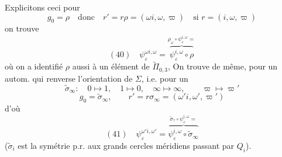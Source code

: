 \documentclass[11pt,a4paper]{article}
\begin{document}
Explicitons ceci pour
\[
  g_0 = \rho \quad \text{donc} \quad
  r' = r\rho = (\omega i, \omega, \varpi) \quad \text{si } r = (i, \omega, \varpi)
\]
on trouve
\[
  (40)\quad
  \psi_\varepsilon^{\omega i, \omega}
  = \overbrace{\psi_\varepsilon^{i,\omega} \circ \rho}^{\rho_\omega \circ \psi_\varepsilon^{i,\omega} =}
\]
où on a identifié $\rho$ aussi à un élément de $\widetilde{\Pi}_{0,3}$,
On trouve de même, pour un autom. qui renverse l'orientation de
$\Sigma$, i.e. pour un
\[
  \widetilde{\sigma}_\infty : \quad
  0 \mapsto 1, \quad 1 \mapsto 0, \quad \infty \mapsto \infty,
  \qquad \varpi \mapsto \varpi'
\]
\[
  g_0 = \widetilde{\sigma}_\infty, \qquad
  r' = r \sigma_\infty = (\omega' i, \omega', \varpi')
\]
d'où
\[
  (41)\quad
  \psi_\varepsilon^{\omega' i, \omega'}
  = \overbrace{\psi_\varepsilon^{i,\omega} \circ \widetilde{\sigma}_\infty}^{\widetilde{\sigma}_{?} \circ \psi_\varepsilon^{i,\omega} =}
\]
($\widetilde{\sigma}_i$ est la symétrie p.r. aux grands cercles méridiens passant par
$Q_i$).
\end{document}

